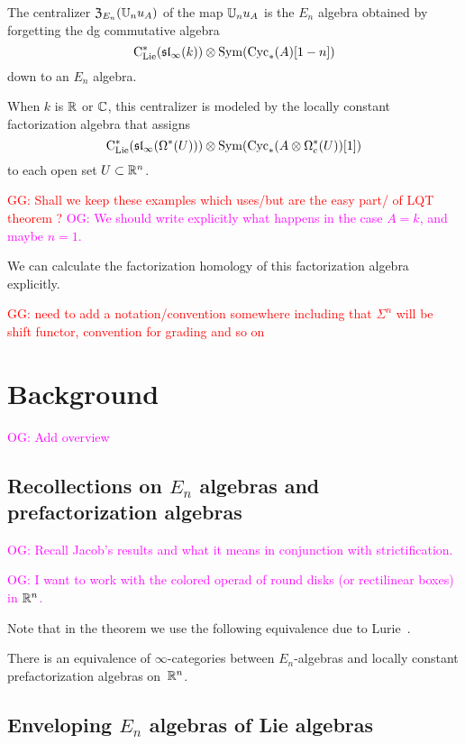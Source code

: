 \documentclass[11pt]{amsart}
\numberwithin{equation}{section}
\def\owen{\textcolor{magenta}{OG: }\textcolor{magenta}}
\def\greg{\textcolor{red}{GG: }\textcolor{red}}
\begin{document}
\begin{thm}
\label{thm: large N}
The centralizer ${\frak Z}_{E_n}(\mathbb U_nu_A)$ of the map $\mathbb U_nu_A$ is the $E_n$ algebra obtained by forgetting the dg commutative algebra
\[
{\rm C}_{\rm Lie}^*(\frak{sl}_\infty(k)) \otimes {\rm Sym}({\rm Cyc}_*(A)[1-n])
\]
down to an $E_n$ algebra.

When $k$ is $\mathbb R$ or $\mathbb C$, this centralizer is modeled by the locally constant factorization algebra that assigns
\[
{\rm C}_{\rm Lie}^*(\frak{sl}_\infty(\Omega^*(U)))\otimes {\rm Sym}({\rm Cyc}_*(A \otimes \Omega^*_c(U))[1])
\]
to each open set $U \subset \mathbb R^n$.
\end{thm}
\greg{Shall we keep these examples which uses/but are the easy part/ of LQT theorem ?}
\owen{We should write explicitly what happens in the case $A = k$, and maybe $n=1$.}

We can calculate the factorization homology of this factorization algebra explicitly.

\greg{need to add a notation/convention somewhere including that $\Sigma^n$ will be shift functor, convention for grading and so on}

\section{Background}

\owen{Add overview}

\subsection{Recollections on $E_n$ algebras and prefactorization algebras}
\label{sec: en background}

\owen{Recall Jacob's results and what it means in conjunction with strictification.}

\owen{I want to work with the colored operad of round disks (or rectilinear boxes) in $\mathbb R^n$.}

Note that in the theorem we use the following equivalence due to Lurie~\cite{LurieHA}. 

\begin{thm}
\label{T:En=Fac} 
There is an equivalence of $\infty$-categories between $E_n$-algebras and locally constant prefactorization algebras on~$\mathbb R^n$.
\end{thm}

\subsection{Enveloping $E_n$ algebras of Lie algebras}
\label{sec: enveloping}
\end{document}
